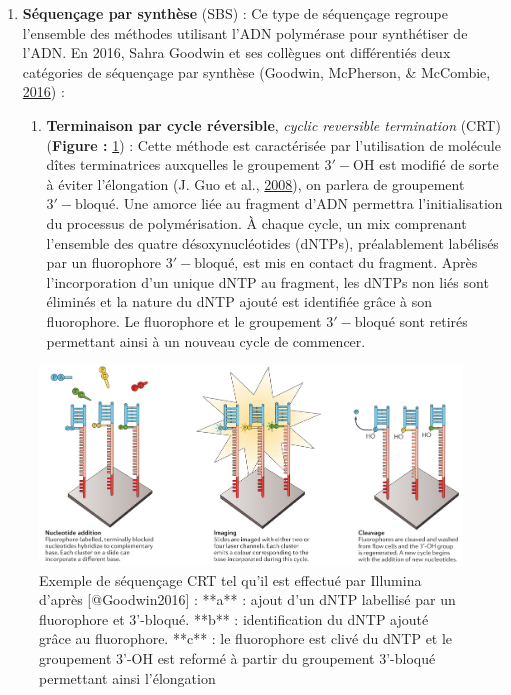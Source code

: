 \documentclass[12pt,twoside]{reedthesis}
\providecommand{\tightlist}{%
  \setlength{\itemsep}{0pt}\setlength{\parskip}{0pt}}
\theoremstyle{definition}
\theoremstyle{definition}
\theoremstyle{remark}
\begin{document}
  \begin{enumerate}
  \def\labelenumi{\arabic{enumi}.}
  \tightlist
  \item
    \textbf{Séquençage par synthèse} (SBS) : Ce type de séquençage
    regroupe l'ensemble des méthodes utilisant l'ADN polymérase pour
    synthétiser de l'ADN. En 2016, Sahra Goodwin et ses collègues ont
    différentiés deux catégories de séquençage par synthèse (Goodwin,
    McPherson, \& McCombie, \protect\hyperlink{ref-Goodwin2016}{2016}) :
  
    \begin{enumerate}
    \def\labelenumii{\alph{enumii}.}
    \tightlist
    \item
      \textbf{Terminaison par cycle réversible}, \emph{cyclic reversible
      termination} (CRT) (\textbf{Figure : }\ref{fig:crtSeq}) : Cette
      méthode est caractérisée par l'utilisation de molécule dîtes
      terminatrices auxquelles le groupement \(\mathrm{3'-OH}\) est
      modifié de sorte à éviter l'élongation (J. Guo et al.,
      \protect\hyperlink{ref-Guo2008}{2008}), on parlera de groupement
      \(\mathrm{3'-bloqué}\). Une amorce liée au fragment d'ADN permettra
      l'initialisation du processus de polymérisation. À chaque cycle, un
      mix comprenant l'ensemble des quatre désoxynucléotides (dNTPs),
      préalablement labélisés par un fluorophore \(\mathrm{3'-bloqué}\),
      est mis en contact du fragment. Après l'incorporation d'un unique
      dNTP au fragment, les dNTPs non liés sont éliminés et la nature du
      dNTP ajouté est identifiée grâce à son fluorophore. Le fluorophore
      et le groupement \(\mathrm{3'-bloqué}\) sont retirés permettant
      ainsi à un nouveau cycle de commencer.
    \end{enumerate}
  \end{enumerate}
  
  \begin{figure}
  
  {\centering \includegraphics[scale=.28]{figure/CRT_seq_illumina} 
  
  }
  
  \caption[Exemple de séquençage CRT tel qu'il est effectué par Illumina]{Exemple de séquençage CRT tel qu'il est effectué par Illumina d'après [@Goodwin2016] : **a** : ajout d'un dNTP labellisé par un fluorophore et 3'-bloqué. **b** : identification du dNTP ajouté grâce au fluorophore. **c** : le fluorophore est clivé du dNTP et le groupement 3'-OH est reformé à partir du groupement 3'-bloqué permettant ainsi l'élongation}\label{fig:crtSeq}
  \end{figure}
  
\end{document}

